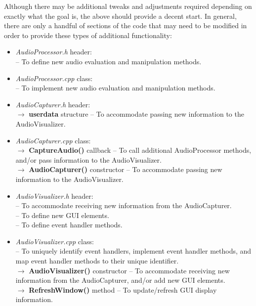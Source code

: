 \documentclass[12pt]{report}
\begin{document}
\indent Although there may be additional tweaks and adjustments required depending on exactly what the goal is, the above should provide a decent start. In general, there are only a handful of sections of the code that may need to be modified in order to provide these types of additional functionality:
\begin{itemize}
	\item \emph{AudioProcessor.h} header:\\	
		-- To define new audio evaluation and manipulation methods.
	\item \emph{AudioProcessor.cpp} class:\\	
		-- To implement new audio evaluation and manipulation methods.
	\item \emph{AudioCapturer.h} header:\\
		$\rightarrow$ {\bf userdata} structure -- To accommodate passing new information to the AudioVisualizer.
	\item \emph{AudioCapturer.cpp} class:\\
		$\rightarrow$ {\bf CaptureAudio()} callback -- To call additional AudioProcessor methods, and/or pass information to the AudioVisualizer.\\
		$\rightarrow$ {\bf AudioCapturer()} constructor -- To accommodate passing new information to the AudioVisualizer.
	\item \emph{AudioVisualizer.h} header:\\ 
		-- To accommodate receiving new information from the AudioCapturer.\\
		-- To define new GUI elements.\\
		-- To define event handler methods.
	\item \emph{AudioVisualizer.cpp} class:\\
		-- To uniquely identify event handlers, implement event handler methods, and map event handler methods to their unique identifier.\\
		$\rightarrow$ {\bf AudioVisualizer()} constructor -- To accommodate receiving new information from the AudioCapturer, and/or add new GUI elements.\\
		$\rightarrow$ {\bf RefreshWindow()} method -- To update/refresh GUI display information.
\end{itemize}
\clearpage


\end{document}

